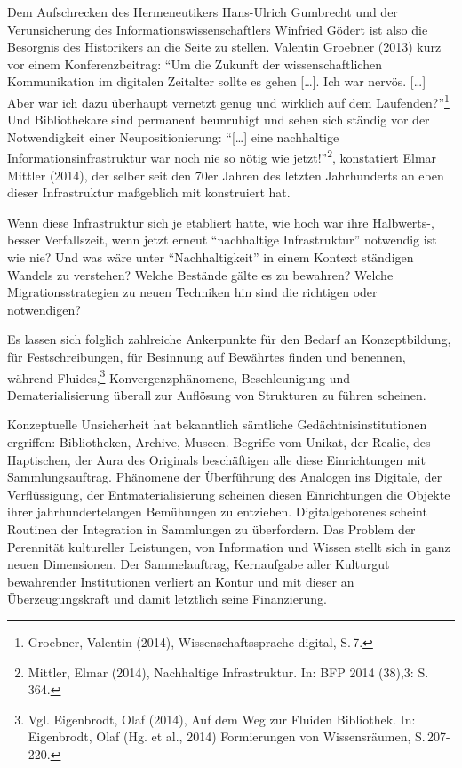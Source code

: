 \documentclass[a4paper,
fontsize=11pt,
oneside,
numbers=noperiodatend,
parskip=half-,
bibliography=totoc,
final
]{scrartcl}
\begin{document}
Dem Aufschrecken des Hermeneutikers Hans-Ulrich Gumbrecht und der
Verunsicherung des Informationswissenschaftlers Winfried Gödert ist also
die Besorgnis des Historikers an die Seite zu stellen. Valentin Groebner
(2013) kurz vor einem Konferenzbeitrag: \enquote{Um die Zukunft der
wissenschaftlichen Kommunikation im digitalen Zeitalter sollte es gehen
{[}\ldots{}{]}. Ich war nervös. {[}\ldots{}{]} Aber war ich dazu
überhaupt vernetzt genug und wirklich auf dem Laufenden?}\footnote{Groebner,
  Valentin (2014), Wissenschaftssprache digital, S.\,7.} Und
Bibliothekare sind permanent beunruhigt und sehen sich ständig vor der
Notwendigkeit einer Neupositionierung: \enquote{{[}\ldots{}{]} eine
nachhaltige Informationsinfrastruktur war noch nie so nötig wie
jetzt!}\footnote{Mittler, Elmar (2014), Nachhaltige Infrastruktur. In:
  BFP 2014 (38),3: S.\,364.}, konstatiert Elmar Mittler (2014), der
selber seit den 70er Jahren des letzten Jahrhunderts an eben dieser
Infrastruktur maßgeblich mit konstruiert hat.

Wenn diese Infrastruktur sich je etabliert hatte, wie hoch war ihre
Halbwerts-, besser Verfallszeit, wenn jetzt erneut \enquote{nachhaltige
Infrastruktur} notwendig ist wie nie? Und was wäre unter
\enquote{Nachhaltigkeit} in einem Kontext ständigen Wandels zu
verstehen? Welche Bestände gälte es zu bewahren? Welche
Migrationsstrategien zu neuen Techniken hin sind die richtigen oder
notwendigen?

Es lassen sich folglich zahlreiche Ankerpunkte für den Bedarf an
Konzeptbildung, für Festschreibungen, für Besinnung auf Bewährtes finden
und benennen, während Fluides,\footnote{Vgl. Eigenbrodt, Olaf (2014),
  Auf dem Weg zur Fluiden Bibliothek. In: Eigenbrodt, Olaf (Hg. et al.,
  2014) Formierungen von Wissensräumen, S.\,207-220.}
Konvergenzphänomene, Beschleunigung und Dematerialisierung überall zur
Auflösung von Strukturen zu führen scheinen.

Konzeptuelle Unsicherheit hat bekanntlich sämtliche
Gedächtnisinstitutionen ergriffen: Bibliotheken, Archive, Museen.
Begriffe vom Unikat, der Realie, des Haptischen, der Aura des Originals
beschäftigen alle diese Einrichtungen mit Sammlungsauftrag. Phänomene
der Überführung des Analogen ins Digitale, der Verflüssigung, der
Entmaterialisierung scheinen diesen Einrichtungen die Objekte ihrer
jahrhundertelangen Bemühungen zu entziehen. Digitalgeborenes scheint
Routinen der Integration in Sammlungen zu überfordern. Das Problem der
Perennität kultureller Leistungen, von Information und Wissen stellt
sich in ganz neuen Dimensionen. Der Sammelauftrag, Kernaufgabe aller
Kulturgut bewahrender Institutionen verliert an Kontur und mit dieser an
Überzeugungskraft und damit letztlich seine Finanzierung.
\end{document}
